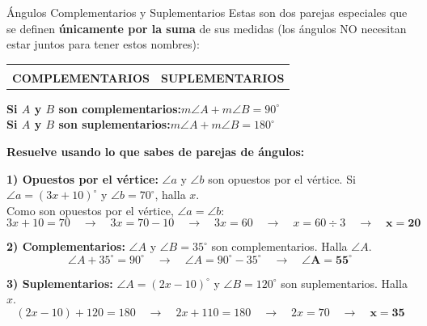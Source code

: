 \documentclass[12pt, letterpaper]{article}
\newcommand{\angulosComplementarios}[2]{%
	\begin{tikzpicture}[scale=0.9]
		\draw[valorange, line width=1pt, fill=valorange, fill opacity=0.3] (0,0) -- (0.7,0) arc (0:55:0.7) -- cycle;
		\draw[valred, line width=1pt, fill=valred, fill opacity=0.3] (0,0) -- (55:0.7) arc (55:90:0.7) -- cycle;
		
		\draw[valdark,line width=1.3pt] (0,0) -- (2.3,0);
		\draw[valdark,line width=1.3pt] (0,0) -- (0,2.3);
		\draw[valdark,line width=1.3pt] (0,0) -- (55:2.1);
		
		\draw[valblue,line width=0.9pt] (0.28,0) -- (0.28,0.28) -- (0,0.28);
		
		\node[valorange,font=\bfseries\small] at (25:1.15) {#1};
		\node[valred,font=\bfseries\small]    at (72:1.15) {#2};
	\end{tikzpicture}%
}
\newcommand{\angulosSuplementarios}[2]{%
	\begin{tikzpicture}[scale=0.9]
		\draw[valorange, line width=1pt, fill=valorange, fill opacity=0.3] (0,0) -- (0.7,0) arc (0:50:0.7) -- cycle;
		\draw[valred, line width=1pt, fill=valred, fill opacity=0.3] (0,0) -- (50:0.7) arc (50:180:0.7) -- cycle;
		
		\draw[valdark,line width=1.3pt] (-2.3,0) -- (2.3,0);
		\draw[valdark,line width=1.3pt] (0,0) -- (50:2.1);
		\fill[valdark] (0,0) circle(1.2pt);
		
		\node[valorange,font=\bfseries\small] at (25:1.2) {#1};
		\node[valred,font=\bfseries\small]    at (115:1.2) {#2};
	\end{tikzpicture}%
}
\begin{document}
	\begin{concepto}{Ángulos Complementarios y Suplementarios}
		Estas son dos parejas especiales que se definen \textbf{únicamente por
			la suma} de sus medidas (los ángulos NO necesitan estar juntos para
		tener estos nombres):
		
		\begin{center}
			\renewcommand{\arraystretch}{1.2}
			\begin{tabular}{cc}
				\angulosComplementarios{$A$}{$B$} & \angulosSuplementarios{$A$}{$B$} \\
				\textbf{\color{valblue}COMPLEMENTARIOS} & \textbf{\color{valred}SUPLEMENTARIOS}
			\end{tabular}
		\end{center}
		
		\begin{tcolorbox}[enhanced, colback=vallightblue, colframe=valblue, arc=3pt]
			\centering\bfseries
			Si $A$ y $B$ son \textbf{complementarios}:\quad $m\angle A + m\angle B = 90^\circ$\\[4pt]
			Si $A$ y $B$ son \textbf{suplementarios}:\quad $m\angle A + m\angle B = 180^\circ$
		\end{tcolorbox}
	\end{concepto}
	
	\begin{ejemplo}
		\textbf{Resuelve usando lo que sabes de parejas de ángulos:}
		
		\vspace{0.2cm}
		\textbf{1) Opuestos por el vértice:} $\angle a$ y $\angle b$ son opuestos
		por el vértice. Si $\angle a = (3x+10)^\circ$ y $\angle b = 70^\circ$,
		halla $x$.\\
		Como son opuestos por el vértice, $\angle a = \angle b$:
		$$3x + 10 = 70 \quad\rightarrow\quad 3x = 70 - 10 \quad\rightarrow\quad
		3x = 60 \quad\rightarrow\quad x=60\div 3 \quad\rightarrow\quad\mathbf{x = 20}$$
		
		\textbf{2) Complementarios:} $\angle A$ y $\angle B = 35^\circ$ son
		complementarios. Halla $\angle A$.
		$$\angle A + 35^\circ = 90^\circ \quad\rightarrow\quad
		\angle A = 90^\circ - 35^\circ \quad\rightarrow\quad \mathbf{\angle A = 55^\circ}$$
		
		\textbf{3) Suplementarios:} $\angle A = (2x-10)^\circ$ y
		$\angle B = 120^\circ$ son suplementarios. Halla $x$.
		$$(2x - 10) + 120 = 180 \quad\rightarrow\quad 2x + 110 = 180
		\quad\rightarrow\quad 2x = 70 \quad\rightarrow\quad \mathbf{x = 35}$$
	\end{ejemplo}
	
\end{document}
